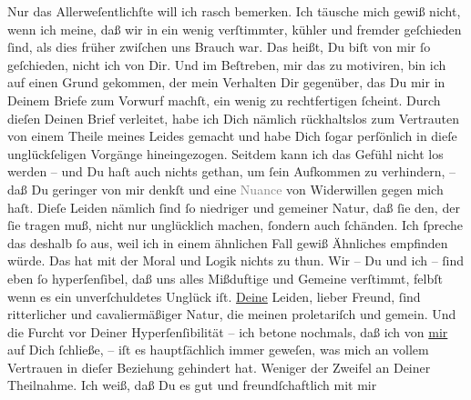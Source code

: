 \pstart
           Nur das Allerweſentlichſte will ich rasch bemerken. Ich täusche mich gewiß nicht,
               wenn ich meine, daß wir in \label{K_L02651-1v}\label{K_L02651-1} ein wenig verſtimmter, kühler und fremder geſchieden{ }ſind,
               als dies früher zwiſchen uns Brauch war. Das heißt, Du biſt von mir{ }ſo geſchieden,
               nicht ich von Dir. Und im Beſtreben, mir das zu motiviren, bin ich auf einen Grund
               gekommen, der mein Verhalten Dir gegenüber, das Du mir in Deinem Briefe zum Vorwurf
               machſt, ein wenig zu rechtfertigen{ }ſcheint. Durch dieſen Deinen Brief verleitet, habe
               ich Dich nämlich rückhaltslos zum Vertrauten von einem Theile meines Leides gemacht
               und habe Dich{ }ſogar perſönlich in dieſe unglückſeligen Vorgänge hineingezogen.
               Seitdem kann ich das Gefühl {\pb}nicht los werden – und
               Du haſt auch nichts gethan, um{ }ſein Aufkommen zu verhindern, – daß Du geringer von
               mir denkſt und eine \textcolor{gray}{Nuance} von Widerwillen gegen mich haſt. Dieſe
               Leiden nämlich{ }ſind{ }ſo niedriger und gemeiner Natur, daß{ }ſie den, der{ }ſie tragen muß,
               nicht nur unglücklich machen,{ }ſondern auch{ }ſchänden. Ich{ }ſpreche das deshalb{ }ſo aus,
               weil ich in einem ähnlichen Fall gewiß Ähnliches empfinden würde. Das hat mit der
               Moral und  Logik nichts zu thun. Wir – Du und ich –{ }ſind eben{ }ſo hyperſenſibel, daß uns
               alles Mißduftige und Gemeine verſtimmt, \strikeout{\textcolor{gray}{ſelbst}} felbſt wenn es ein unverſchuldetes Unglück iſt. \uline{Deine} Leiden, lieber Freund,{ }ſind ritterlicher und cavaliermäßiger Natur,
               die meinen proletariſch und gemein. Und {\pb}die Furcht
               vor Deiner Hyperſenſibilität – ich betone nochmals, daß ich von \uline{mir} auf Dich{ }ſchließe, – iſt es hauptſächlich immer
               geweſen, was mich an vollem Vertrauen in dieſer Beziehung gehindert hat. Weniger der
               Zweifel an Deiner Theilnahme. Ich weiß, daß Du es gut und freundſchaftlich mit mir
